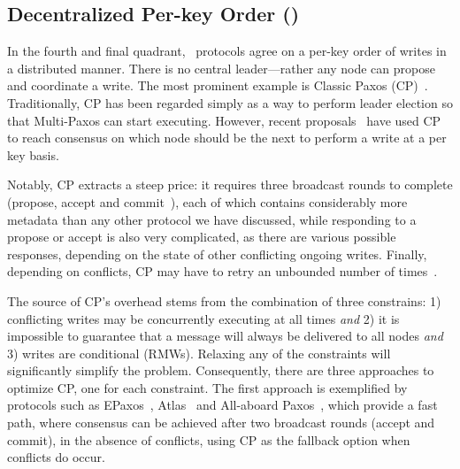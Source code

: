 \subsection{Decentralized Per-key Order (\DPKO)}\label{sec:tax:dpko}
In the fourth and final quadrant, \DPKO~protocols %
agree on a per-key order of writes in a distributed manner. There is no central leader---rather any node can propose and coordinate a write. 
The most prominent example is Classic Paxos (CP)~\cite{Lamport:1998}.
Traditionally, CP has been regarded simply as a way to perform leader election so that Multi-Paxos can start executing.
However, recent proposals~\cite{Skrzypczak:2020, Rystsov:2018, V:2020}
have used CP to reach consensus on which node should be the next to perform a write at a per key basis.



Notably, CP extracts a steep price: it requires three broadcast rounds to complete (propose, accept and commit~\cite{Howard:2019}), each of which contains considerably more metadata than any other protocol we have discussed, while responding to a propose or accept is also very complicated, as there are various possible responses, depending on the state of other conflicting ongoing writes. Finally, depending on conflicts, CP may have to retry an unbounded number of times~\cite{Fischer:1985}. 

The source of CP's overhead stems from the combination of three constrains:
1) conflicting writes may be concurrently executing at all times \emph{and}
2) it is impossible to guarantee that a message will always be delivered to all nodes \emph{and}
3) writes are conditional (\ie RMWs).
Relaxing any of the constraints will significantly simplify the problem.
Consequently, there are three approaches to optimize CP, one for each constraint.
The first approach is exemplified by protocols such as EPaxos~\cite{Moraru:2013}, Atlas~\cite{Enes:2020} and All-aboard Paxos~\cite{Howard:2019}, which provide a fast path, where consensus can be achieved after two broadcast rounds (accept and commit), 
in the absence of conflicts, 
using CP as the fallback option when conflicts do occur.

